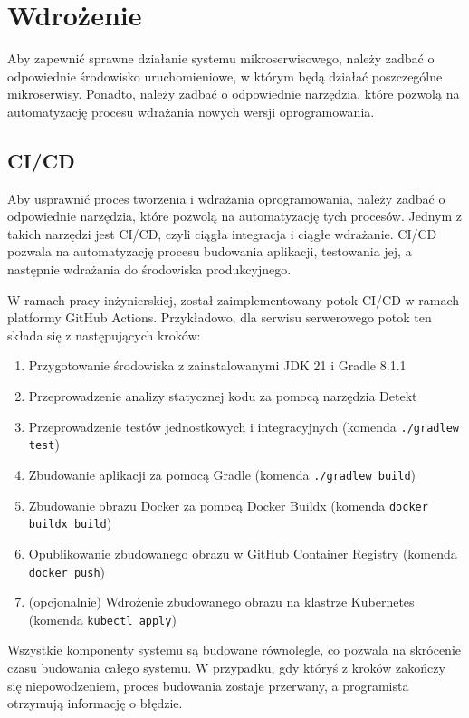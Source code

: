 \clearpage %

\section{Wdrożenie}

Aby zapewnić sprawne działanie systemu mikroserwisowego, należy zadbać o odpowiednie środowisko uruchomieniowe, w którym będą działać poszczególne mikroserwisy. Ponadto, należy zadbać o odpowiednie narzędzia, które pozwolą na automatyzację procesu wdrażania nowych wersji oprogramowania.

\subsection{CI/CD}

Aby usprawnić proces tworzenia i wdrażania oprogramowania, należy zadbać o odpowiednie narzędzia, które pozwolą na automatyzację tych procesów. Jednym z takich narzędzi jest CI/CD, czyli ciągła integracja i ciągłe wdrażanie. CI/CD pozwala na automatyzację procesu budowania aplikacji, testowania jej, a następnie wdrażania do środowiska produkcyjnego.

W ramach pracy inżynierskiej, został zaimplementowany potok CI/CD w ramach platformy GitHub Actions. Przykładowo, dla serwisu serwerowego potok ten składa się z następujących kroków:

\begin{enumerate}
    \item Przygotowanie środowiska z zainstalowanymi JDK 21 i Gradle \cite{gradle} 8.1.1
    \item Przeprowadzenie analizy statycznej kodu za pomocą narzędzia Detekt \cite{detekt}
    \item Przeprowadzenie testów jednostkowych i integracyjnych (komenda \texttt{./gradlew test})
    \item Zbudowanie aplikacji za pomocą Gradle (komenda \texttt{./gradlew build})
    \item Zbudowanie obrazu Docker za pomocą Docker Buildx (komenda \texttt{docker buildx build})
    \item Opublikowanie zbudowanego obrazu w GitHub Container Registry \cite{ghcr} (komenda \texttt{docker push})
    \item (opcjonalnie) Wdrożenie zbudowanego obrazu na klastrze Kubernetes (komenda \texttt{kubectl apply})
\end{enumerate}

Wszystkie komponenty systemu są budowane równolegle, co pozwala na skrócenie czasu budowania całego systemu. W przypadku, gdy któryś z kroków zakończy się niepowodzeniem, proces budowania zostaje przerwany, a programista otrzymują informację o błędzie.

